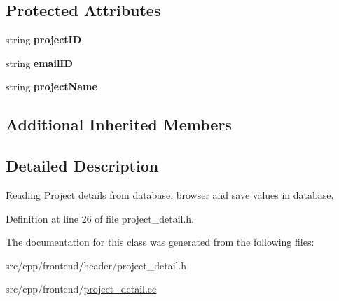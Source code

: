 \subsection*{Protected Attributes}
\begin{DoxyCompactItemize}
\item 
\hypertarget{classProjectDetail_a78077f627165a879087d1bfa499f257c}{string {\bfseries project\-I\-D}}\label{classProjectDetail_a78077f627165a879087d1bfa499f257c}

\item 
\hypertarget{classProjectDetail_aa1d9bfd957c6a283df7bafc94e8a3d00}{string {\bfseries email\-I\-D}}\label{classProjectDetail_aa1d9bfd957c6a283df7bafc94e8a3d00}

\item 
\hypertarget{classProjectDetail_a668aa8cd414b45ad25604c7c21173700}{string {\bfseries project\-Name}}\label{classProjectDetail_a668aa8cd414b45ad25604c7c21173700}

\end{DoxyCompactItemize}
\subsection*{Additional Inherited Members}


\subsection{Detailed Description}
Reading Project details from database, browser and save values in database. 

Definition at line 26 of file project\-\_\-detail.\-h.



The documentation for this class was generated from the following files\-:\begin{DoxyCompactItemize}
\item 
src/cpp/frontend/header/project\-\_\-detail.\-h\item 
src/cpp/frontend/\hyperlink{project__detail_8cc}{project\-\_\-detail.\-cc}\end{DoxyCompactItemize}
